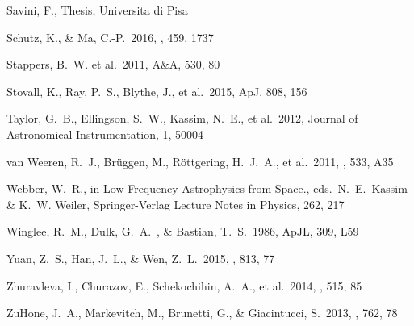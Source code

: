 \documentclass[11pt]{article}
\begin{document}
\begin{thebibliography}{}
\bibitem[Savini et al.2015] Savini, F., Thesis, Universita di Pisa

 Schutz, K., \& Ma, C.-P.\ 2016, \mnras, 459, 1737 


 Stappers, B.~W. et al.\ 2011, A\&A, 530, 80 



 Stovall, K., Ray, P.~S., Blythe, J., et al.\ 2015, ApJ, 808, 156 

 Taylor, G.~B., Ellingson, S.~W., Kassim, N.~E., et al.\ 2012, Journal of Astronomical Instrumentation, 1, 50004 

 van Weeren, R.~J., Br{\"u}ggen, M., R{\"o}ttgering, H.~J.~A., et al.\ 2011, \aap, 533, A35 


 Webber, W.~R., in Low Frequency Astrophysics from Space., eds.~N.~E.~Kassim \& K.~W. Weiler, Springer-Verlag Lecture Notes in Physics, 262, 217   

 Winglee, R.~M., Dulk, G.~A.\
, \& Bastian, T.~S.\ 1986, ApJL, 309, L59

 Yuan, Z.~S., Han, J.~L., \& Wen, Z.~L.\ 2015, \apj, 813, 77

 Zhuravleva, I., Churazov, E., Schekochihin, A.~A., et al.\ 2014, \nat, 515, 85 

 ZuHone, J.~A., Markevitch, M., Brunetti, G., \& Giacintucci, S.\ 2013, \apj, 762, 78 



\end{thebibliography}
\end{document}
